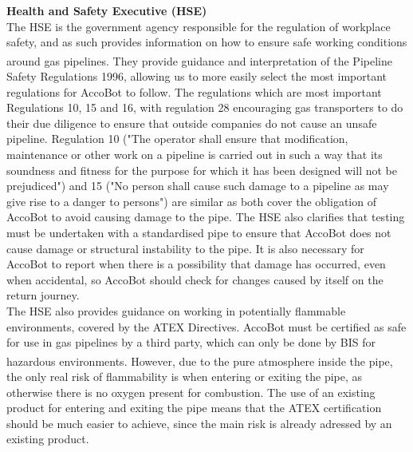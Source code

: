 \documentclass[11pt]{article}		%
\newcommand{\supercite}[1]{\textsuperscript{\cite{#1}}}		%
\begin{document}
			\textbf{Health and Safety Executive (HSE)}
			\\
			The HSE is the government agency responsible for the regulation of workplace safety, and as such provides information on how to ensure safe working conditions around gas pipelines.
			They provide guidance and interpretation\supercite{hse1996guide} of the Pipeline Safety Regulations 1996, allowing us to more easily select the most important regulations for AccoBot to follow.
			The regulations which are most important Regulations 10, 15 and 16, with regulation 28 encouraging gas transporters to do their due diligence to ensure that outside companies do not cause an unsafe pipeline.
			Regulation 10 ("The operator shall ensure that modification, maintenance or other work on a pipeline is carried out in such a way that its soundness and fitness for the purpose for which it has been designed will not be prejudiced") and 15 ("No person shall cause such damage to a pipeline as may give rise to a danger to persons") are similar as both cover the obligation of AccoBot to avoid causing damage to the pipe.
			The HSE also clarifies that testing must be undertaken with a standardised pipe to ensure that AccoBot does not cause damage or structural instability to the pipe.
			It is also necessary for AccoBot to report when there is a possibility that damage has occurred, even when accidental, so AccoBot should check for changes caused by itself on the return journey.
			\\
            \hspace*{2ex}The HSE also provides guidance on working in potentially flammable environments, covered by the ATEX Directives.
			AccoBot must be certified as safe for use in gas pipelines by a third party, which can only be done by BIS for hazardous environments\supercite{ATEX}.
			However, due to the pure atmosphere inside the pipe, the only real risk of flammability is when entering or exiting the pipe, as otherwise there is no oxygen present for combustion.
			The use of an existing product for entering and exiting the pipe means that the ATEX certification should be much easier to achieve, since the main risk is already adressed by an existing product.
			
\end{document}
